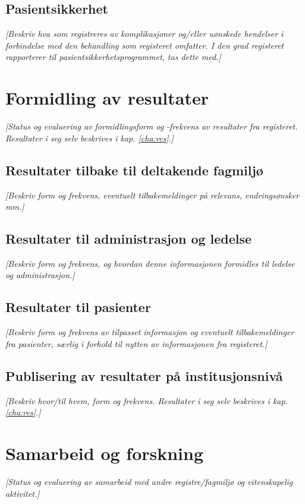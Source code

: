 \documentclass[norsk, a4paper, twocolumn]{report}
\newcommand{\guide}[1] {
	\textit{[\textcolor{guidegray}{#1}]}
	}
\begin{document}
\section{Pasientsikkerhet}\label{sec:kom}
\guide{Beskriv hva som registreres av komplikasjoner og/eller uønskede
hendelser i forbindelse med den behandling som registeret omfatter. I den grad
registeret rapporterer til pasientsikkerhetsprogrammet, tas dette med.}




\chapter{Formidling av resultater}\label{cha:dat}
\guide{Status og evaluering av formidlingsform og -frekvens
av resultater fra registeret. Resultater i seg selv beskrives i kap.
\ref{cha:res}.}

\section{Resultater tilbake til deltakende fagmiljø}\label{sec:resfag}
\guide{Beskriv form og frekvens,  eventuelt tilbakemeldinger på relevans,
endringsønsker mm.}

\section{Resultater til administrasjon og ledelse}\label{sec:resled}
\guide{Beskriv form og frekvens, og hvordan denne
informasjonen formidles til ledelse og administrasjon.}

\section{Resultater til pasienter}\label{sec:respas}
\guide{Beskriv form og frekvens av tilpasset informasjon og eventuelt
tilbakemeldinger fra pasienter, særlig i forhold til nytten av informasjonen
fra registeret.}

\section{Publisering av resultater på institusjonsnivå}\label{sec:off}
\guide{Beskriv hvor/til hvem, form og frekvens. Resultater i seg selv beskrives i kap. \ref{cha:res}.}




\chapter{Samarbeid og forskning}\label{cha:for}
\guide{Status og evaluering av samarbeid med andre registre/fagmiljø og  vitenskapelig aktivitet.}
\end{document}

